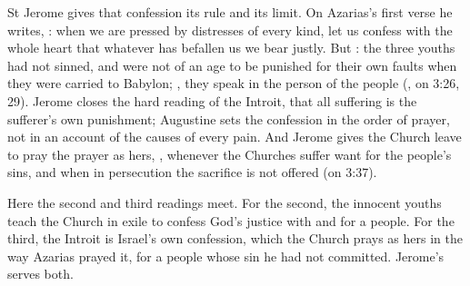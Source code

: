 St Jerome gives that confession its rule and its limit. On Azarias's first
verse he writes, :
when we are pressed by distresses of every kind, let us confess with the whole
heart that whatever has befallen us we bear justly. But : the three youths had not sinned, and were not of an age
to be punished for their own faults when they were carried to Babylon;
, they speak in the person of the
people (, on 3:26, 29). Jerome closes the hard
reading of the Introit, that all suffering is the sufferer's own punishment;
Augustine sets the confession in the order of prayer, not in an account of the
causes of every pain. And Jerome gives the Church leave to pray the prayer as
hers, ,
whenever the Churches suffer want for the people's sins, and when in
persecution the sacrifice is not offered (on 3:37).

Here the second and third readings meet. For the second, the innocent youths
teach the Church in exile to confess God's justice with and for a people. For
the third, the Introit is Israel's own confession, which the Church prays as
hers in the way Azarias prayed it, for a people whose sin he had not committed.
Jerome's  serves both.

